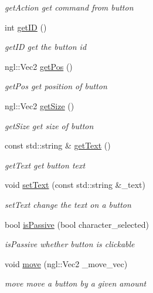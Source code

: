 \begin{DoxyCompactItemize}
\begin{DoxyCompactList}\small\item\em get\+Action get command from button \end{DoxyCompactList}\item 
int \hyperlink{class_button_a7742284b70f51fa2dc01261bdb1a85cc}{get\+I\+D} ()
\begin{DoxyCompactList}\small\item\em get\+I\+D get the button id \end{DoxyCompactList}\item 
ngl\+::\+Vec2 \hyperlink{class_button_a081804797f423289a39b53ec8a3b5081}{get\+Pos} ()
\begin{DoxyCompactList}\small\item\em get\+Pos get position of button \end{DoxyCompactList}\item 
ngl\+::\+Vec2 \hyperlink{class_button_a4c78e21af0948f71b4309ac213b1a8a4}{get\+Size} ()
\begin{DoxyCompactList}\small\item\em get\+Size get size of button \end{DoxyCompactList}\item 
const std\+::string \& \hyperlink{class_button_a04fc244e0ef86558e79b8f431009da98}{get\+Text} ()
\begin{DoxyCompactList}\small\item\em get\+Text get button text \end{DoxyCompactList}\item 
void \hyperlink{class_button_a508c680bc1e2df818da8aac915d4f679}{set\+Text} (const std\+::string \&\+\_\+text)
\begin{DoxyCompactList}\small\item\em set\+Text change the text on a button \end{DoxyCompactList}\item 
bool \hyperlink{class_button_a32272696b66994639151e87126756cf5}{is\+Passive} (bool character\+\_\+selected)
\begin{DoxyCompactList}\small\item\em is\+Passive whether button is clickable \end{DoxyCompactList}\item 
void \hyperlink{class_button_adceec3c7035099c448a7e0b8e4fc0ae1}{move} (ngl\+::\+Vec2 \+\_\+move\+\_\+vec)
\begin{DoxyCompactList}\small\item\em move move a button by a given amount \end{DoxyCompactList}\end{DoxyCompactItemize}
